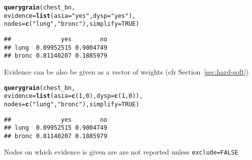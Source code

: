 \documentclass[10pt]{article}\usepackage[]{graphicx}\usepackage[]{xcolor}
\makeatletter
\newcommand{\hlnum}[1]{\textcolor[rgb]{0.686,0.059,0.569}{#1}}%
\newcommand{\hlstr}[1]{\textcolor[rgb]{0.192,0.494,0.8}{#1}}%
\newcommand{\hlstd}[1]{\textcolor[rgb]{0.345,0.345,0.345}{#1}}%
\newcommand{\hlkwc}[1]{\textcolor[rgb]{0.333,0.667,0.333}{#1}}%
\newcommand{\hlkwd}[1]{\textcolor[rgb]{0.737,0.353,0.396}{\textbf{#1}}}%
\newenvironment{kframe}{%
 \def\at@end@of@kframe{}%
 \ifinner\ifhmode%
  \def\at@end@of@kframe{\end{minipage}}%
  \begin{minipage}{\columnwidth}%
 \fi\fi%
 \def\FrameCommand##1{\hskip\@totalleftmargin \hskip-\fboxsep
 \colorbox{shadecolor}{##1}\hskip-\fboxsep
     \hskip-\linewidth \hskip-\@totalleftmargin \hskip\columnwidth}%
 \MakeFramed {\advance\hsize-\width
   \@totalleftmargin\z@ \linewidth\hsize
   \@setminipage}}%
 {\par\unskip\endMakeFramed%
 \at@end@of@kframe}
\newenvironment{knitrout}{}{} %
\def\code#1{{\texttt{#1}}}
\makeatother
\begin{document}
\begin{enumerate}
\begin{knitrout}
\color{fgcolor}\begin{kframe}
\begin{alltt}
\hlkwd{querygrain}\hlstd{(chest_bn,}
           \hlkwc{evidence}\hlstd{=}\hlkwd{list}\hlstd{(}\hlkwc{asia}\hlstd{=}\hlstr{"yes"}\hlstd{,} \hlkwc{dysp}\hlstd{=}\hlstr{"yes"}\hlstd{),}
           \hlkwc{nodes}\hlstd{=}\hlkwd{c}\hlstd{(}\hlstr{"lung"}\hlstd{,} \hlstr{"bronc"}\hlstd{),} \hlkwc{simplify} \hlstd{=} \hlnum{TRUE}\hlstd{)}
\end{alltt}
\begin{verbatim}
##              yes        no
## lung  0.09952515 0.9004749
## bronc 0.81140207 0.1885979
\end{verbatim}
\end{kframe}
\end{knitrout}

Evidence can be also be given as a vector of weights (cfr Section~\ref{sec:hard-soft})
\begin{knitrout}
\color{fgcolor}\begin{kframe}
\begin{alltt}
\hlkwd{querygrain}\hlstd{(chest_bn,}
           \hlkwc{evidence}\hlstd{=}\hlkwd{list}\hlstd{(}\hlkwc{asia}\hlstd{=}\hlkwd{c}\hlstd{(}\hlnum{1}\hlstd{,}\hlnum{0}\hlstd{),} \hlkwc{dysp}\hlstd{=}\hlkwd{c}\hlstd{(}\hlnum{1}\hlstd{,}\hlnum{0}\hlstd{)),}
           \hlkwc{nodes}\hlstd{=}\hlkwd{c}\hlstd{(}\hlstr{"lung"}\hlstd{,} \hlstr{"bronc"}\hlstd{),} \hlkwc{simplify} \hlstd{=} \hlnum{TRUE}\hlstd{)}
\end{alltt}
\begin{verbatim}
##              yes        no
## lung  0.09952515 0.9004749
## bronc 0.81140207 0.1885979
\end{verbatim}
\end{kframe}
\end{knitrout}

Nodes on which evidence is given are are not reported unless \code{exclude=FALSE}


\end{enumerate}
\end{document}
